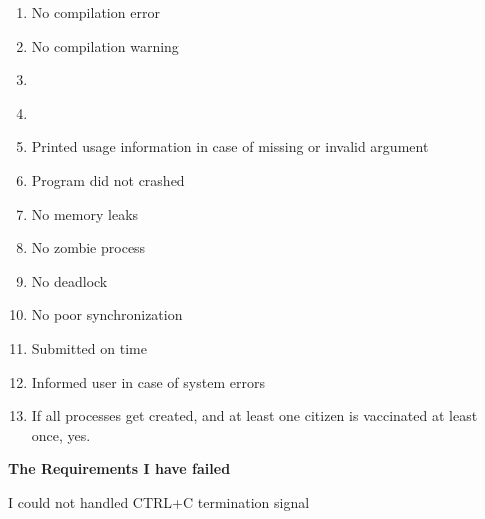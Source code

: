 \documentclass{report}
\begin{document}
\begin{enumerate}
    \item {\large No compilation error }
    \item {\large No compilation warning}
    \item {\large {} }
    \item {\large {}}
    \item {\large Printed usage information in case of missing or invalid argument}
    \item {\large Program did not crashed}
    \item {\large No memory leaks}
    \item {\large No zombie process}
    \item {\large No deadlock}
    \item {\large No poor synchronization}
    \item {\large Submitted on time}
    \item {\large Informed user in case of system errors}
    \item {\large If all processes get created, and at least one citizen is vaccinated at least once, yes.}
    
\end{enumerate}

{\huge \textbf{The Requirements I have failed} \\}

{\large I could not handled CTRL+C termination signal\\}
\end{document}
